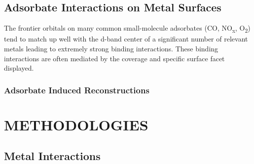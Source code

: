 \documentclass[draft]{nddiss2e}
\begin{document}
\section{Adsorbate Interactions on Metal Surfaces}
The frontier orbitals on many common small-molecule adsorbates (CO,
NO\textsubscript{x}, O\textsubscript{2}) tend to match up well with the d-band
center of a significant number of relevant metals leading to extremely strong
binding interactions. These binding interactions are often mediated by the
coverage and specific surface facet displayed.


\subsection{Adsorbate Induced Reconstructions}


\chapter{METHODOLOGIES}

\section{Metal Interactions}
\end{document}
